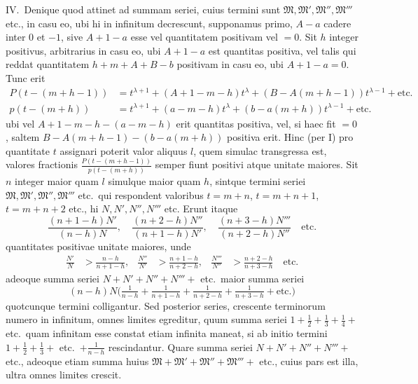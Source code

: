 \documentclass[12pt,a4paper]{article}
\begin{document}
IV.\ Denique quod attinet ad summam seriei, cuius termini sunt $\mathfrak{M}, \mathfrak{M}', \mathfrak{M}'', \mathfrak{M}'''$ etc., in casu eo, ubi hi in infinitum decrescunt, supponamus primo, $A-a$ cadere inter $0$ et $-1$, sive $A+1-a$ esse vel quantitatem positivam vel $=0$. Sit $h$ integer positivus, arbitrarius in casu eo, ubi $A+1-a$ est quantitas positiva, vel talis qui reddat quantitatem $h+m+A+B-b$ positivam in casu eo, ubi $A+1-a=0$. Tunc erit
\begin{align*}
P(t-(m+h-1)) &= t^{\lambda+1} + (A+1-m-h)t^{\lambda} + (B-A(m+h-1))t^{\lambda-1} + \text{etc.}\\
p(t-(m+h)) &= t^{\lambda+1} + (a-m-h)t^{\lambda} + (b-a(m+h))t^{\lambda-1} + \text{etc.}
\end{align*}
ubi vel $A+1-m-h-(a-m-h)$ erit quantitas positiva, vel, si haec fit $=0$, saltem $B-A(m+h-1)-(b-a(m+h))$ positiva erit. Hinc (per I) pro quantitate $t$ assignari poterit valor aliquus $l$, quem simulac transgressa est, valores fractionis $\frac{P(t-(m+h-1))}{p(t-(m+h))}$ semper fiunt positivi atque unitate maiores. Sit $n$ integer maior quam $l$ simulque maior quam $h$, sintque termini seriei $\mathfrak{M}, \mathfrak{M}', \mathfrak{M}'', \mathfrak{M}'''$ etc.\ qui respondent valoribus $t=m+n$, $t=m+n+1$, $t=m+n+2$ etc., hi $N, N', N'', N'''$ etc. Erunt itaque
\[
\frac{(n+1-h)N'}{(n-h)N},\quad \frac{(n+2-h)N''}{(n+1-h)N'},\quad \frac{(n+3-h)N'''}{(n+2-h)N''} \quad \text{etc.}
\]
quantitates positivae unitate maiores, unde
\begin{align*}
\frac{N'}{N} &> \frac{n-h}{n+1-h}, & \frac{N''}{N'} &> \frac{n+1-h}{n+2-h}, & \frac{N'''}{N''} &> \frac{n+2-h}{n+3-h} \quad \text{etc.}
\end{align*}
adeoque summa seriei $N+N'+N''+N'''+$ etc.\ maior summa seriei
\[
(n-h)N\bigl(\tfrac{1}{n-h} + \tfrac{1}{n+1-h} + \tfrac{1}{n+2-h} + \tfrac{1}{n+3-h} + \text{etc.}\bigr)
\]
quotcunque termini colligantur. Sed posterior series, crescente terminorum numero in infinitum, omnes limites egreditur, quum summa seriei $1+\frac{1}{2}+\frac{1}{3}+\frac{1}{4}+$ etc.\ quam infinitam esse constat etiam infinita maneat, si ab initio termini $1+\frac{1}{2}+\frac{1}{3}+$ etc.\ $+\frac{1}{n-h}$ rescindantur. Quare summa seriei $N+N'+N''+N'''+$ etc., adeoque etiam summa huius $\mathfrak{M}+\mathfrak{M}'+\mathfrak{M}''+\mathfrak{M}'''+$ etc., cuius pars est illa, ultra omnes limites crescit.
\end{document}
